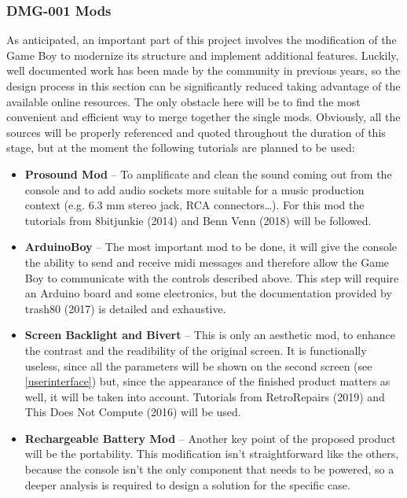 \documentclass[]{article}
\begin{document}
        
        \subsubsection{DMG-001 Mods}\label{mods}
            As anticipated, an important part of this project involves the modification of the Game Boy to modernize its structure and implement additional features.
            Luckily, well documented work has been made by the community in previous years, so the design process in this section can be significantly reduced
            taking advantage of the available online resources. The only obstacle here will be to find the most convenient and efficient way to merge together the
            single mods. Obviously, all the sources will be properly referenced and quoted throughout the duration of this stage, but at the moment the following tutorials 
            are planned to be used:

            \begin{itemize}
                \item \textbf{Prosound Mod} -- To amplificate and clean the sound coming out from the console and to add audio sockets more suitable for a 
                        music production context (e.g. 6.3 mm stereo jack, RCA connectors\dots). For this mod the tutorials from 8bitjunkie (2014)\nocite{8BITJUNKIE2014} 
                        and Benn Venn (2018)\nocite{BENNVENN2018} will be followed.
                \item \textbf{ArduinoBoy} -- The most important mod to be done, it will give the console the ability to send and receive midi messages and therefore 
                        allow the Game Boy to communicate with the controls described above. This step will require an Arduino board and some electronics, but the 
                        documentation provided by trash80 (2017)\nocite{TRASH802017} is detailed and exhaustive.
                \item \textbf{Screen Backlight and Bivert} -- This is only an aesthetic mod, to enhance the contrast and the readibility of the original screen. 
                        It is functionally useless, since all the parameters will be shown on the second screen (see \ref{userinterface}) but, since the appearance of 
                        the finished product matters as well, it will be taken into account. Tutorials from RetroRepairs (2019)\nocite{RETROREPAIRS2019} and This Does Not Compute (2016)\nocite{THISDOESNOTCOMPUTE2016} will be used. 
                \item \textbf{Rechargeable Battery Mod} -- Another key point of the proposed product will be the portability. This modification isn't straightforward 
                        like the others, because the console isn't the only component that needs to be powered, so a deeper analysis is required to design a solution for the 
                        specific case.
            \end{itemize}
\end{document}
